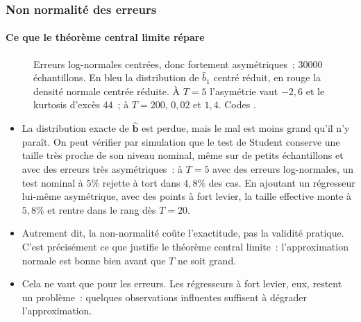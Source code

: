 \documentclass[10pt]{beamer}
\begin{document}
\begin{frame}[c]
  \frametitle{Non normalité des erreurs}
  \framesubtitle{Ce que le théorème central limite répare}

  \begin{figure}
    \centering
    \scalebox{.34}{}
    \caption{Erreurs log-normales centrées, donc fortement asymétriques~; $30000$
      échantillons. En bleu la distribution de $\hat b_1$ centré réduit, en rouge la
      densité normale centrée réduite. À $T=5$ l'asymétrie vaut $-2{,}6$ et le kurtosis
      d'excès $44$~; à $T=200$, $0{,}02$ et $1{,}4$. Codes
      .}
  \end{figure}

\end{frame}


\begin{notes}

  \begin{itemize}

  \item La distribution exacte de $\hat{\mathbf b}$ est perdue, mais le mal est moins
    grand qu'il n'y paraît. On peut vérifier par simulation que le test de Student
    conserve une taille très proche de son niveau nominal, même sur de petits
    échantillons et avec des erreurs très asymétriques~: à $T=5$ avec des erreurs
    log-normales, un test nominal à $5\%$ rejette à tort dans $4{,}8\%$ des cas. En
    ajoutant un régresseur lui-même asymétrique, avec des points à fort levier, la
    taille effective monte à $5{,}8\%$ et rentre dans le rang dès $T=20$.\newline

  \item Autrement dit, la non-normalité coûte l'exactitude, pas la validité pratique.
    C'est précisément ce que justifie le théorème central limite~: l'approximation
    normale est bonne bien avant que $T$ ne soit grand.\newline

  \item[\dbend] Cela ne vaut que pour les erreurs. Les régresseurs à fort levier, eux,
    restent un problème~: quelques observations influentes suffisent à dégrader
    l'approximation.

  \end{itemize}

\end{notes}
\end{document}
